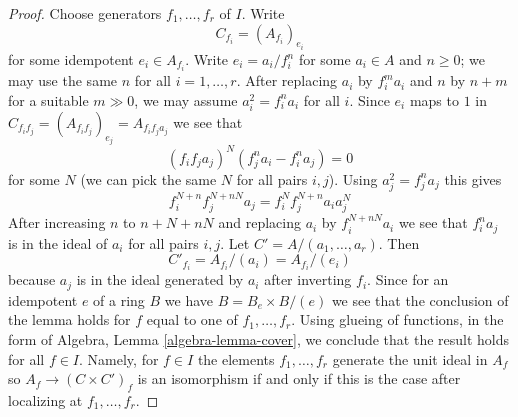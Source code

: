 \documentclass[10pt,a4paper]{amsart}
\theoremstyle{plain}
\theoremstyle{definition}
\theoremstyle{remark}
\numberwithin{equation}{subsection}
\begin{document}
\begin{proof}
Choose generators $f_1, \ldots, f_r$ of $I$. Write
$$
C_{f_i} = (A_{f_i})_{e_i}
$$
for some idempotent $e_i \in A_{f_i}$. Write $e_i = a_i/f_i^n$
for some $a_i \in A$ and $n \geq 0$; we may use the same $n$
for all $i = 1, \ldots, r$. After replacing $a_i$ by $f_i^ma_i$
and $n$ by $n + m$ for a suitable $m \gg 0$, we may assume
$a_i^2 = f_i^n a_i$ for all $i$. Since $e_i$ maps to $1$ in
$C_{f_if_j} = (A_{f_if_j})_{e_j} = A_{f_if_ja_j}$ we see that
$$
(f_if_ja_j)^N(f_j^n a_i  - f_i^na_j) = 0
$$
for some $N$ (we can pick the same $N$ for all pairs $i, j$). Using
$a_j^2 = f_j^na_j$ this gives
$$
f_i^{N + n} f_j^{N + nN} a_j = f_i^N f_j^{N + n} a_ia_j^N
$$
After increasing $n$ to $n + N + nN$ and replacing $a_i$ by $f_i^{N + nN}a_i$
we see that $f_i^n a_j$ is in the ideal of $a_i$ for all pairs $i, j$.
Let $C' = A/(a_1, \ldots, a_r)$. Then
$$
C'_{f_i} = A_{f_i}/(a_i) = A_{f_i}/(e_i)
$$
because $a_j$ is in the ideal generated by $a_i$ after inverting $f_i$.
Since for an idempotent $e$ of a ring $B$ we have $B = B_e \times B/(e)$
we see that the conclusion of the lemma holds for $f$ equal to one
of $f_1, \ldots, f_r$. Using glueing of functions, in the form of
Algebra, Lemma \ref{algebra-lemma-cover},
we conclude that the result holds for all $f \in I$.
Namely, for $f \in I$ the elements $f_1, \ldots, f_r$
generate the unit ideal in $A_f$ so $A_f \to (C \times C')_f$
is an isomorphism if and only if this is the case after localizing
at $f_1, \ldots, f_r$.
\end{proof}
\end{document}
